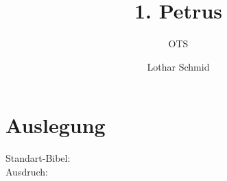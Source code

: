 \documentclass[12pt]{mybibreport}
\author{OTS}
\title{1. Petrus}
\author{Lothar Schmid}
\date{}
\begin{document}
\mytitlepage
\tableofcontents


\chapter{Auslegung}
    Standart-Bibel: \getdefault \\
    Ausdruch: \getversions \\ 

    





\end{document}
